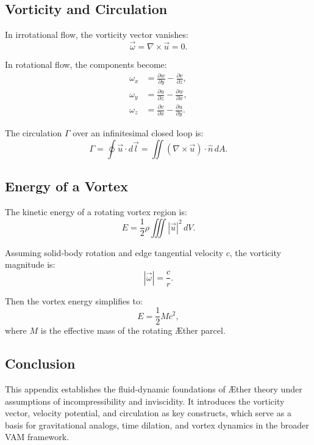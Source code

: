 \documentclass[12pt]{article}
\begin{document}
    \subsection*{Vorticity and Circulation}
    In irrotational flow, the vorticity vector vanishes:
    \begin{equation}
        \vec{\omega} = \nabla \times \vec{u} = 0.
    \end{equation}

    In rotational flow, the components become:
    \begin{align}
        \omega_x &= \frac{\partial w}{\partial y} - \frac{\partial v}{\partial z}, \\
        \omega_y &= \frac{\partial u}{\partial z} - \frac{\partial w}{\partial x}, \\
        \omega_z &= \frac{\partial v}{\partial x} - \frac{\partial u}{\partial y}.
    \end{align}

    The circulation \(\Gamma\) over an infinitesimal closed loop is:
    \begin{equation}
        \Gamma = \oint \vec{u} \cdot d\vec{l} = \iint (\nabla \times \vec{u}) \cdot \hat{n} \, dA.
    \end{equation}

    \subsection*{Energy of a Vortex}
    The kinetic energy of a rotating vortex region is:
    \begin{equation}
        E = \frac{1}{2} \rho \iiint |\vec{u}|^2 \, dV.
    \end{equation}

    Assuming solid-body rotation and edge tangential velocity \(c\), the vorticity magnitude is:
    \begin{equation}
        |\vec{\omega}| = \frac{c}{r}.
    \end{equation}

    Then the vortex energy simplifies to:
    \begin{equation}
        E = \frac{1}{2} M c^2,
    \end{equation}
    where \(M\) is the effective mass of the rotating Æther parcel.

    \subsection*{Conclusion}
    This appendix establishes the fluid-dynamic foundations of Æther theory under assumptions of incompressibility and inviscidity. It introduces the vorticity vector, velocity potential, and circulation as key constructs, which serve as a basis for gravitational analogs, time dilation, and vortex dynamics in the broader VAM framework.

\ifdefined\standalonechapter
\else


\end{document}
